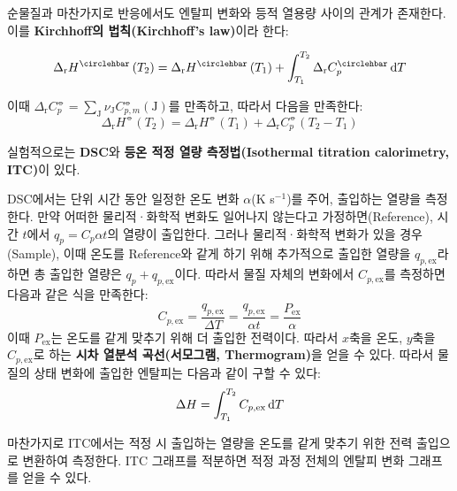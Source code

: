         \par 순물질과 마찬가지로 반응에서도 엔탈피 변화와 등적 열용량 사이의 관계가 존재한다. 이를 \textbf{Kirchhoff의 법칙(Kirchhoff's law)}이라 한다:
        \begin{law}[Kirchhoff의 법칙]\label{kirlaw}
        \begin{equation*}
            \Delta_\mathrm{r}H^{\circlehbar}\left(T_2 \right) = \Delta_\mathrm{r}H^{\circlehbar}\left( T_1 \right) + \int_{T_1}^{T_2}\Delta_\mathrm{r}C^{\circlehbar}_{p}\difform T
        \end{equation*}
        \end{law}
        이때 $\displaystyle\Delta_{\mathrm{r}}C^{\circlehbar}_{p} = \sum_{\mathrm{J}}\nu_{\mathrm{J}}C^{\circlehbar}_{p,m}\left(\mathrm{J}\right)$를 만족하고, 따라서 다음을 만족한다: 
        \begin{equation*}
            \Delta_\mathrm{r}H^{\circlehbar}\left(T_2 \right) = \Delta_\mathrm{r}H^{\circlehbar}\left(T_1 \right) + \Delta_\mathrm{r}C^{\circlehbar}_{p}\left(T_2 - T_1 \right)
        \end{equation*}
        \par 실험적으로는 \textbf{DSC}와 \textbf{등온 적정 열량 측정법(Isothermal titration calorimetry, ITC)}이 있다.
        \par DSC에서는 단위 시간 동안 일정한 온도 변화 $\alpha$(K s$^{-1}$)를 주어, 출입하는 열량을 측정한다. 만약 어떠한 물리적·화학적 변화도 일어나지 않는다고 
        가정하면(Reference), 시간 $t$에서 $q_p = C_p \alpha t$의 열량이 출입한다. 그러나 물리적·화학적 변화가 있을 경우(Sample), 이때 온도를 Reference와 같게 하기 
        위해 추가적으로 출입한 열량을 $q_{p,\mathrm{ex}}$라 하면 총 출입한 열량은 $q_p + q_{p,\mathrm{ex}}$이다. 따라서 물질 자체의 변화에서 
        $C_{p,\mathrm{ex}}$를 측정하면 다음과 같은 식을 만족한다:
        \begin{equation*}
            C_{p,\mathrm{ex}} = \frac{q_{p,\mathrm{ex}}}{\Delta T} = \frac{q_{p,\mathrm{ex}}}{\alpha t} = \frac{P_{\mathrm{ex}}}{\alpha}
        \end{equation*}
        이때 $P_{\mathrm{ex}}$는 온도를 같게 맞추기 위해 더 출입한 전력이다. 따라서 $x$축을 온도, $y$축을 $C_{p,\mathrm{ex}}$로 하는 
        \textbf{시차 열분석 곡선(서모그램, Thermogram)}을 얻을 수 있다. 따라서 물질의 상태 변화에 출입한 엔탈피는 다음과 같이 구할 수 있다:
        \begin{equation*}
            \Delta H = \int_{T_1}^{T_2}C_{p,\mathrm{ex}}\operatorname{d\!} T
        \end{equation*}
        \par 마찬가지로 ITC에서는 적정 시 출입하는 열량을 온도를 같게 맞추기 위한 전력 출입으로 변환하여 측정한다. ITC 그래프를 적분하면 적정 과정 전체의 엔탈피 
        변화 그래프를 얻을 수 있다.
